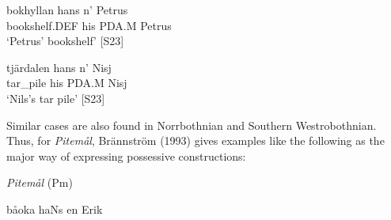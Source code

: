 \z

\item 


 \ea\label{}
\gll bokhyllan  hans  n’  Petrus\\


bookshelf.DEF  his  PDA.M  Petrus\\

\glt ‘Petrus’ bookshelf’ [S23]

\z

\item 


 \ea\label{}
\gll tjärdalen  hans  n’  Nisj\\


tar\_pile  his  PDA.M  Nisj\\

\glt ‘Nils’s tar pile’ [S23]

\z

Similar cases are also found in Norrbothnian and Southern Westrobothnian. Thus, for \textit{Pitemål}, Brännström (1993) gives examples like the following as the major way of expressing possessive constructions:


\item 

\textit{Pitemål }(Pm)



\item 


 \ea\label{}
\gll båoka  haNs  en  Erik  \\



